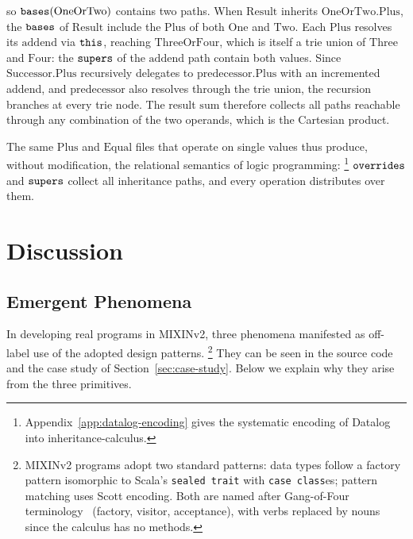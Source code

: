 so $\mathtt{bases}(\mathrm{OneOrTwo})$ contains two paths.
When $\mathrm{Result}$ inherits
$\mathrm{OneOrTwo}.\mathrm{Plus}$, the $\mathtt{bases}$ of
$\mathrm{Result}$ include the $\mathrm{Plus}$ of both
$\mathrm{One}$ and $\mathrm{Two}$.
Each $\mathrm{Plus}$ resolves its $\mathrm{addend}$ via
$\mathtt{this}$, reaching $\mathrm{ThreeOrFour}$, which is itself a
trie union of $\mathrm{Three}$ and $\mathrm{Four}$:
the $\mathtt{supers}$ of the $\mathrm{addend}$ path contain both values.
Since $\mathrm{Successor}.\mathrm{Plus}$ recursively delegates to
$\mathrm{predecessor}.\mathrm{Plus}$ with an incremented addend,
and $\mathrm{predecessor}$ also resolves through the trie union,
the recursion branches at every trie node.
The result $\mathrm{sum}$ therefore collects all paths reachable
through any combination of the two operands, which is the
Cartesian product.

The same $\mathrm{Plus}$ and $\mathrm{Equal}$ files that operate on
single values thus produce, without modification, the relational
semantics of logic programming:%
\footnote{
  Appendix~\ref{app:datalog-encoding} gives the systematic
  encoding of Datalog into inheritance-calculus.
}
$\mathtt{overrides}$ and $\mathtt{supers}$ collect all inheritance paths, and
every operation distributes over them.

\section{Discussion}

\subsection{Emergent Phenomena}
\label{sec:emergent-phenomena}

In developing real programs in MIXINv2, three phenomena manifested as off-label use of the adopted design patterns.%
\footnote{
  MIXINv2 programs adopt two standard patterns:
  data types follow a factory pattern isomorphic to Scala's
  \texttt{sealed trait} with \texttt{case class}es;
  pattern matching uses Scott encoding.
  Both are named after Gang-of-Four
  terminology~\cite{gamma1994-design-patterns}
  (factory, visitor, acceptance), with verbs replaced by
  nouns since the calculus has no methods.
}
They can be seen in the
source code
and the case study of Section~\ref{sec:case-study}.
Below we explain why they arise from the three primitives.

